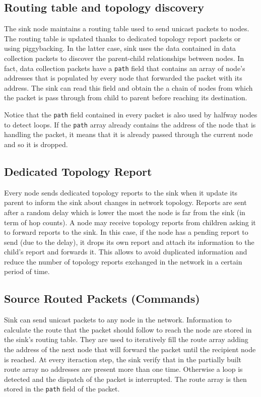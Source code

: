 \subsection{Routing table and topology discovery}

The sink node maintains a routing table used to send unicast packets to nodes. The routing table is updated thanks to dedicated topology report packets or using piggybacking. In the latter case, sink uses the data contained in data collection packets to discover the parent-child relationships between nodes. In fact, data collection packets have a \texttt{path} field that contains an array of node's addresses that is populated by every node that forwarded the packet with its address. The sink can read this field and obtain the a chain of nodes from which the packet is pass through from child to parent before reaching its destination.

Notice that the \texttt{path} field contained in every packet is also used by halfway nodes to detect loops. If the \texttt{path} array already contains the address of the node that is handling the packet, it means that it is already passed through the current node and so it is dropped.


\subsection{Dedicated Topology Report}

Every node sends dedicated topology reports to the sink when it update its parent to inform the sink about changes in network topology. Reports are sent after a random delay which is lower the most the node is far from the sink (in term of hop counts).
A node may receive topology reports from children asking it to forward reports to the sink. In this case, if the node has a pending report to send (due to the delay), it drops its own report and attach its information to the child's report and forwards it. This allows to avoid duplicated information and reduce the number of topology reports exchanged in the network in a certain period of time.


\subsection{Source Routed Packets (Commands)}

Sink can send unicast packets to any node in the network. Information to calculate the route that the packet should follow to reach the node are stored in the sink's routing table. They are used to iteratively fill the route array adding the address of the next node that will forward the packet until the recipient node is reached. At every iteraction step, the sink verify that in the partially built route array no addresses are present more than one time. Otherwise a loop is detected and the dispatch of the packet is interrupted. The route array is then stored in the \texttt{path} field of the packet. 

